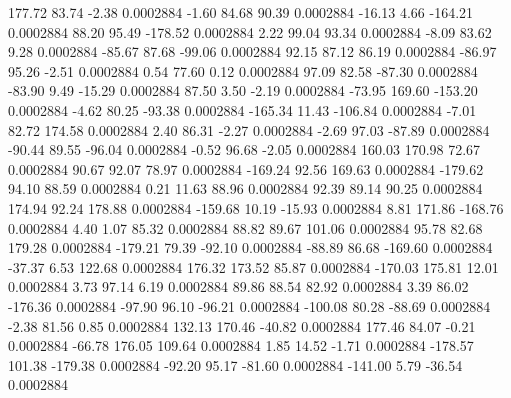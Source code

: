       177.72       83.74       -2.38     0.0002884
       -1.60       84.68       90.39     0.0002884
      -16.13        4.66     -164.21     0.0002884
       88.20       95.49     -178.52     0.0002884
        2.22       99.04       93.34     0.0002884
       -8.09       83.62        9.28     0.0002884
      -85.67       87.68      -99.06     0.0002884
       92.15       87.12       86.19     0.0002884
      -86.97       95.26       -2.51     0.0002884
        0.54       77.60        0.12     0.0002884
       97.09       82.58      -87.30     0.0002884
      -83.90        9.49      -15.29     0.0002884
       87.50        3.50       -2.19     0.0002884
      -73.95      169.60     -153.20     0.0002884
       -4.62       80.25      -93.38     0.0002884
     -165.34       11.43     -106.84     0.0002884
       -7.01       82.72      174.58     0.0002884
        2.40       86.31       -2.27     0.0002884
       -2.69       97.03      -87.89     0.0002884
      -90.44       89.55      -96.04     0.0002884
       -0.52       96.68       -2.05     0.0002884
      160.03      170.98       72.67     0.0002884
       90.67       92.07       78.97     0.0002884
     -169.24       92.56      169.63     0.0002884
     -179.62       94.10       88.59     0.0002884
        0.21       11.63       88.96     0.0002884
       92.39       89.14       90.25     0.0002884
      174.94       92.24      178.88     0.0002884
     -159.68       10.19      -15.93     0.0002884
        8.81      171.86     -168.76     0.0002884
        4.40        1.07       85.32     0.0002884
       88.82       89.67      101.06     0.0002884
       95.78       82.68      179.28     0.0002884
     -179.21       79.39      -92.10     0.0002884
      -88.89       86.68     -169.60     0.0002884
      -37.37        6.53      122.68     0.0002884
      176.32      173.52       85.87     0.0002884
     -170.03      175.81       12.01     0.0002884
        3.73       97.14        6.19     0.0002884
       89.86       88.54       82.92     0.0002884
        3.39       86.02     -176.36     0.0002884
      -97.90       96.10      -96.21     0.0002884
     -100.08       80.28      -88.69     0.0002884
       -2.38       81.56        0.85     0.0002884
      132.13      170.46      -40.82     0.0002884
      177.46       84.07       -0.21     0.0002884
      -66.78      176.05      109.64     0.0002884
        1.85       14.52       -1.71     0.0002884
     -178.57      101.38     -179.38     0.0002884
      -92.20       95.17      -81.60     0.0002884
     -141.00        5.79      -36.54     0.0002884
